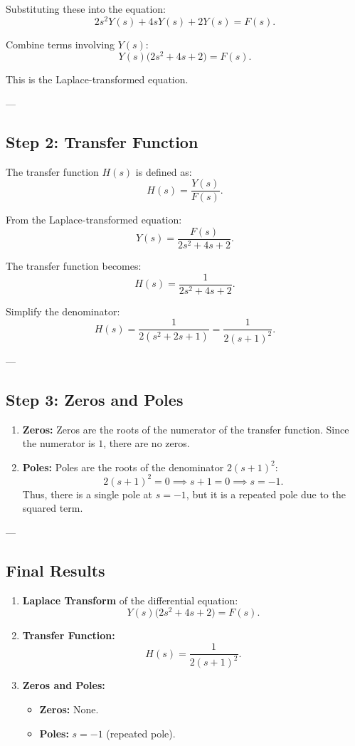 \documentclass[12pt]{article}
\begin{document}
Substituting these into the equation:
\[
2s^2 Y(s) + 4s Y(s) + 2Y(s) = F(s).
\]

Combine terms involving \( Y(s) \):
\[
Y(s) \big( 2s^2 + 4s + 2 \big) = F(s).
\]

This is the Laplace-transformed equation.

---

\subsection*{Step 2: Transfer Function}
The transfer function \( H(s) \) is defined as:
\[
H(s) = \frac{Y(s)}{F(s)}.
\]

From the Laplace-transformed equation:
\[
Y(s) = \frac{F(s)}{2s^2 + 4s + 2}.
\]

The transfer function becomes:
\[
H(s) = \frac{1}{2s^2 + 4s + 2}.
\]

Simplify the denominator:
\[
H(s) = \frac{1}{2(s^2 + 2s + 1)} = \frac{1}{2(s+1)^2}.
\]

---

\subsection*{Step 3: Zeros and Poles}
\begin{enumerate}
    \item \textbf{Zeros:}  
    Zeros are the roots of the numerator of the transfer function. Since the numerator is \( 1 \), there are no zeros.

    \item \textbf{Poles:}  
    Poles are the roots of the denominator \( 2(s+1)^2 \):
    \[
    2(s+1)^2 = 0 \implies s+1 = 0 \implies s = -1.
    \]
    Thus, there is a single pole at \( s = -1 \), but it is a repeated pole due to the squared term.
\end{enumerate}

---

\subsection*{Final Results}
\begin{enumerate}
    \item \textbf{Laplace Transform} of the differential equation:
    \[
    Y(s) \big( 2s^2 + 4s + 2 \big) = F(s).
    \]

    \item \textbf{Transfer Function:}
    \[
    H(s) = \frac{1}{2(s+1)^2}.
    \]

    \item \textbf{Zeros and Poles:}
    \begin{itemize}
        \item \textbf{Zeros:} None.
        \item \textbf{Poles:} \( s = -1 \) (repeated pole).
    \end{itemize}
\end{enumerate}
\end{document}
